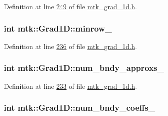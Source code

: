 Definition at line \hyperlink{mtk__grad__1d_8h_source_l00249}{249} of file \hyperlink{mtk__grad__1d_8h_source}{mtk\+\_\+grad\+\_\+1d.\+h}.

\hypertarget{classmtk_1_1Grad1D_a27b8a20e163ad803546592cc3736c12a}{
\subsubsection[{minrow\+\_\+}]{\setlength{\rightskip}{0pt plus 5cm}int mtk\+::\+Grad1\+D\+::minrow\+\_\+\hspace{0.3cm}{\ttfamily [private]}}}\label{classmtk_1_1Grad1D_a27b8a20e163ad803546592cc3736c12a}


Definition at line \hyperlink{mtk__grad__1d_8h_source_l00236}{236} of file \hyperlink{mtk__grad__1d_8h_source}{mtk\+\_\+grad\+\_\+1d.\+h}.

\hypertarget{classmtk_1_1Grad1D_abe15c1ffd9dfaba1a65f4f0e096287ce}{
\subsubsection[{num\+\_\+bndy\+\_\+approxs\+\_\+}]{\setlength{\rightskip}{0pt plus 5cm}int mtk\+::\+Grad1\+D\+::num\+\_\+bndy\+\_\+approxs\+\_\+\hspace{0.3cm}{\ttfamily [private]}}}\label{classmtk_1_1Grad1D_abe15c1ffd9dfaba1a65f4f0e096287ce}


Definition at line \hyperlink{mtk__grad__1d_8h_source_l00233}{233} of file \hyperlink{mtk__grad__1d_8h_source}{mtk\+\_\+grad\+\_\+1d.\+h}.

\hypertarget{classmtk_1_1Grad1D_a60c560882bc601f9ab1d4cd5331e55ef}{
\subsubsection[{num\+\_\+bndy\+\_\+coeffs\+\_\+}]{\setlength{\rightskip}{0pt plus 5cm}int mtk\+::\+Grad1\+D\+::num\+\_\+bndy\+\_\+coeffs\+\_\+\hspace{0.3cm}{\ttfamily [private]}}}\label{classmtk_1_1Grad1D_a60c560882bc601f9ab1d4cd5331e55ef}


